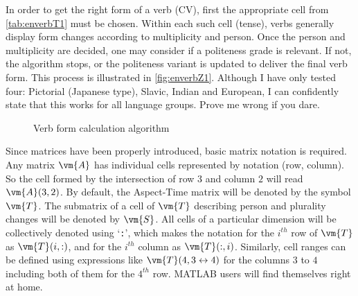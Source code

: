 In order to get the right form of a verb (CV), first the appropriate cell from \autoref{tab:enverbT1} must be chosen. Within each such cell (tense), verbs generally display form changes according to multiplicity and person. Once the person and multiplicity are decided, one may consider if a politeness grade is relevant. If not, the algorithm stops, or the politeness variant is updated to deliver the final verb form. This process is illustrated in \autoref{fig:enverbZ1}. Although I have only tested four: Pictorial (Japanese type), Slavic, Indian and European, I can confidently state that this works for all language groups.  Prove me wrong if you dare. 

\begin{figure}[bth]
    \centering
{}
\caption{Verb form calculation algorithm}
\label{fig:enverbZ1}
\end{figure}
Since matrices have been properly introduced, basic matrix notation is required. Any matrix $\vm{A}$ has individual cells represented by notation (row, column). So the cell formed by the intersection of row $3$ and column $2$ will read $\vm{A}(3,2)$.  By default, the Aspect-Time matrix will be denoted by the symbol $\vm{T}$. The submatrix of a cell of $\vm{T}$ describing person and plurality changes will be denoted by $\vm{S}$. All cells of a particular dimension will be collectively denoted using `\texttt{:}', which makes the notation for the $i^{th}$ row of $\vm{T}$ as $\vm{T}(i,:)$, and for the $i^{th}$ column as $\vm{T}(:,i)$. Similarly, cell ranges can be defined using expressions like $\vm{T}(4,3\leftrightarrow 4)$ for the columns $3$ to $4$ including both of them for the $4^{th}$ row. MATLAB users will find themselves right at home.

